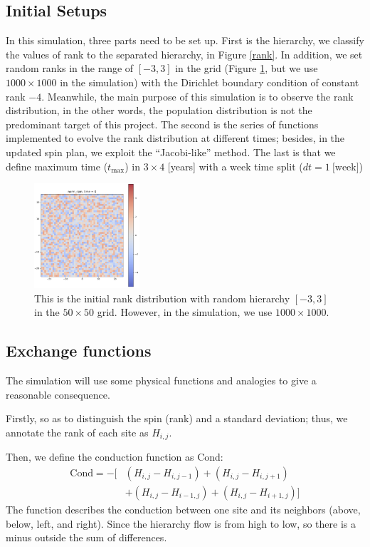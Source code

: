 \documentclass[10pt]{article}
\begin{document}
\begin{multicols}{2}
    \subsection{Initial Setups}
        In this simulation, three parts need to be set up. First is the hierarchy, we classify the values of rank to the separated hierarchy, in Figure \ref{rank}. In addition, we set random ranks in the range of $[-3,3]$ in the grid (Figure \ref{ini_grid}, but we use $1000 \times 1000$ in the simulation) with the Dirichlet boundary condition of constant rank $-4$. Meanwhile, the main purpose of this simulation is to observe the rank distribution, in the other words, the population distribution is not the predominant target of this project. The second is the series of functions implemented to evolve the rank distribution at different times; besides, in the updated spin plan, we exploit the ``Jacobi-like'' method. The last is that we define maximum time ($t_{\text{max}}$) in $3 \times 4$ [years] with a week time split ($dt = 1\ \text{[week]}$)
    
    \begin{figure}[H]
        \centering 
        \includegraphics[width = 0.35\textwidth]{grid.png}
        \caption{This is the initial rank distribution with random hierarchy $[-3, 3]$ in the $50 \times 50$ grid. However, in the simulation, we use $1000 \times 1000$.}
        \label{ini_grid}
    \end{figure}
    
    \subsection{Exchange functions}
        The simulation will use some physical functions and analogies to give a reasonable consequence.

        Firstly, so as to distinguish the spin (rank) and a standard deviation; thus, we annotate the rank of each site as $H_{i,j}$.
            
        Then, we define the conduction function as Cond:
        \begin{align*}
            \text{Cond} = -\Big[  & (H_{i,j}-H_{i,j-1}) + (H_{i,j}-H_{i,j+1})   \\
                                  & + (H_{i,j} - H_{i-1,j}) + (H_{i,j} - H_{i+1,j}) \Big]
        \end{align*}
        The function describes the conduction between one site and its neighbors (above, below, left, and right). Since the hierarchy flow is from high to low, so there is a minus outside the sum of differences.


\end{multicols}
\end{document}

